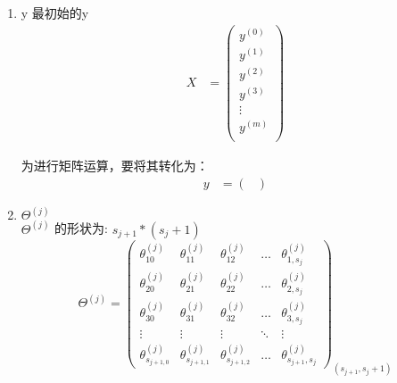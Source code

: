 \begin{enumerate}
\item y
最初始的y
\begin{equation} \begin{aligned}
	X & = \left(\begin{matrix}
			y^{(0)} \\ y^{(1)} \\ y^{(2)} \\ y^{(3)} \\ \vdots \\ y^{(m)} \\
		\end{matrix}\right)
\end{aligned} \end{equation}

为进行矩阵运算，要将其转化为：
\begin{equation}\begin{aligned}
	y &= \left(\begin{matrix}

		\end{matrix}\right)
\end{aligned}\end{equation}


\item $\Theta^{(j)}$  \\

$\Theta^{(j)}$ 的形状为: $s_{j+1}*(s_j+1)$ \\

\begin{equation}
\Theta^{(j)} = 
	\left(\begin{matrix}
		\theta_{10}^{(j)} & \theta_{11}^{(j)} & \theta_{12}^{(j)} & \dots & \theta_{1,s_j}^{(j)} \\
		\theta_{20}^{(j)} & \theta_{21}^{(j)} & \theta_{22}^{(j)} & \dots & \theta_{2,s_j}^{(j)} \\
		\theta_{30}^{(j)} & \theta_{31}^{(j)} & \theta_{32}^{(j)} & \dots & \theta_{3,s_j}^{(j)} \\
		\vdots    & \vdots    & \vdots    & \ddots & \vdots   \\
		\theta_{s_{j+1,0}}^{(j)} & \theta_{s_{j+1,1}}^{(j)} & \theta_{s_{j+1,2}}^{(j)} & \dots & \theta_{s_{j+1},s_j}^{(j)}
	\end{matrix}\right)_{(s_{j+1},s_j+1)}
\end{equation}




\end{enumerate}



